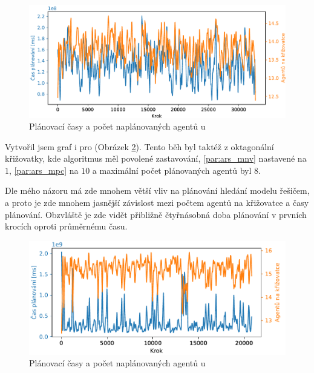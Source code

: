 \begin{figure}[h]
	\centering
	\includegraphics[width=140mm]{../img/CasVsAgentiSATRSG}
	\caption{Plánovací časy a počet naplánovaných agentů u }
	\label{fig:cas_vs_agenti_satrsg}
\end{figure}

Vytvořil jsem graf i pro  (Obrázek \ref{fig:cas_vs_agenti_satra}).
Tento běh byl taktéž z oktagonální křižovatky, kde algoritmus měl povolené zastavování,
\ref{par:ars_mnv} nastavené na $1$, \ref{par:ars_mpc} na $10$ a maximální počet plánovaných agentů byl $8$.

Dle mého názoru má zde mnohem větší vliv na plánování hledání modelu řešičem,
a proto je zde mnohem jasnější závislost mezi počtem agentů na křižovatce a časy plánování.
Obzvláště je zde vidět přibližně čtyřnásobná doba plánování v prvních krocích oproti průměrnému času.


\begin{figure}[h]
	\centering
	\includegraphics[width=140mm]{../img/CasVsAgentiSATRA}
	\caption{Plánovací časy a počet naplánovaných agentů u }
	\label{fig:cas_vs_agenti_satra}
\end{figure}


